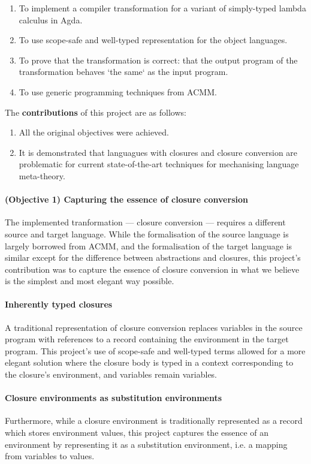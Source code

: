 \documentclass[bsc,frontabs,oneside,singlespacing,parskip,deptreport]{infthesis}
\theoremstyle{definition}
\theoremstyle{lemma}
\begin{document}
\begin{enumerate}
\item To implement a compiler transformation for a variant of
  simply-typed lambda calculus in Agda.
\item To use scope-safe and well-typed representation for the object
  languages.
\item To prove that the transformation is correct: that the output
  program of the transformation behaves `the same` as the input
  program.
\item To use generic programming techniques from ACMM.
\end{enumerate}

The \textbf{contributions} of this project are as follows:

\begin{enumerate}
\item All the original objectives were achieved.
\item It is demonstrated that languagues with closures and closure
  conversion are problematic for current state-of-the-art techniques
  for mechanising language meta-theory.
\end{enumerate}

\paragraph{(Objective 1) Capturing the essence of closure conversion}
The implemented tranformation --- closure conversion --- requires a
different source and target language. While the formalisation of the
source language is largely borrowed from ACMM, and the formalisation
of the target language is similar except for the difference between
abstractions and closures, this project's contribution was to capture
the essence of closure conversion in what we believe is the simplest
and most elegant way possible.

\paragraph{Inherently typed closures}
A traditional representation of closure conversion replaces variables
in the source program with references to a record containing the
environment in the target program. This project's use of scope-safe
and well-typed terms allowed for a more elegant solution where the
closure body is typed in a context corresponding to the closure's
environment, and variables remain variables.

\paragraph{Closure environments as substitution environments}
Furthermore, while a closure environment is traditionally represented
as a record which stores environment values, this project captures the
essence of an environment by representing it as a substitution
environment, i.e. a mapping from variables to values.
\end{document}
